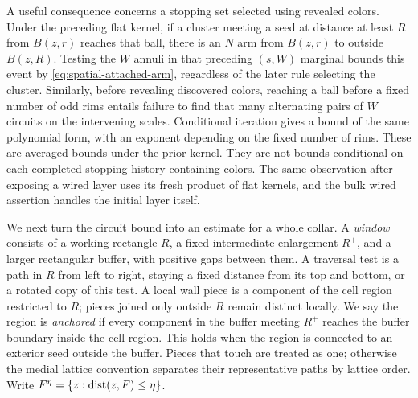 A useful consequence concerns a stopping set selected using revealed
colors. Under the preceding flat kernel, if a cluster meeting a seed
at distance at least $R$ from $B(z,r)$ reaches that ball, there is an
$N$ arm from $B(z,r)$ to outside $B(z,R)$. Testing the $W$ annuli in
that preceding $(s,W)$ marginal bounds this event by
\eqref{eq:spatial-attached-arm}, regardless of the later rule selecting
the cluster. Similarly, before revealing discovered colors, reaching a
ball before a fixed number of odd rims entails failure to find that
many alternating pairs of $W$ circuits on the intervening scales.
Conditional iteration gives a bound of the same polynomial form, with
an exponent depending on the fixed number of rims. These are averaged
bounds under the prior kernel. They are not bounds conditional on each
completed stopping history containing colors. The same observation after
exposing a wired layer uses its fresh product of flat kernels, and the
bulk wired assertion handles the initial layer itself.

We next turn the circuit bound into an estimate for a whole collar.
A \emph{window} consists of a working rectangle $R$, a fixed intermediate
enlargement $R^+$, and a larger rectangular buffer, with positive gaps
between them. A traversal test is a path in $R$ from left to right,
staying a fixed distance from its top and bottom, or a rotated copy of
this test. A local wall piece is a component of the cell region
restricted to $R$; pieces joined only outside $R$ remain distinct
locally. We say the region is \emph{anchored} if every component in
the buffer meeting $R^+$ reaches the buffer boundary inside the cell
region. This holds when the region is connected to an exterior seed
outside the buffer. Pieces that touch are treated as one; otherwise the
medial
lattice convention separates their representative paths by lattice
order. Write $F^\eta=\{z:\operatorname{dist}(z,F)\le\eta\}$.

